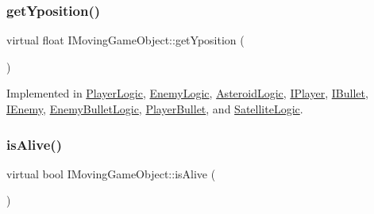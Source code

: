 \mbox{\label{class_i_moving_game_object_a153c0017219e17262a9cceddba3f61d6}} 
\subsubsection{\texorpdfstring{get\+Yposition()}{getYposition()}}
{\footnotesize\ttfamily virtual float I\+Moving\+Game\+Object\+::get\+Yposition (\begin{DoxyParamCaption}{ }\end{DoxyParamCaption})\hspace{0.3cm}{\ttfamily [pure virtual]}}



Implemented in \hyperlink{class_player_logic_a58d683bde5ee078f3b21897f2a5f4677}{Player\+Logic}, \hyperlink{class_enemy_logic_ae614032054926a4a25ed56f61111392b}{Enemy\+Logic}, \hyperlink{class_asteroid_logic_a83863c5262a29b2999d04ad443622bbc}{Asteroid\+Logic}, \hyperlink{class_i_player_af72407abf2418dd9c1df50f29d51f0ef}{I\+Player}, \hyperlink{class_i_bullet_a36594de9a0c0ddd7083bca10ef5d8332}{I\+Bullet}, \hyperlink{class_i_enemy_a8011be7f510f6630250f8b9529815773}{I\+Enemy}, \hyperlink{class_enemy_bullet_logic_a0cfb3013a7613f7f6de91a6db04d03b1}{Enemy\+Bullet\+Logic}, \hyperlink{class_player_bullet_a240cab35d5d909366986b8661ee65d3c}{Player\+Bullet}, and \hyperlink{class_satellite_logic_a1b0cb67d5bdb3cb120ec12b2be65755c}{Satellite\+Logic}.

\mbox{\label{class_i_moving_game_object_ab88f75c872699dd1376e5e83f6188e34}} 
\subsubsection{\texorpdfstring{is\+Alive()}{isAlive()}}
{\footnotesize\ttfamily virtual bool I\+Moving\+Game\+Object\+::is\+Alive (\begin{DoxyParamCaption}{ }\end{DoxyParamCaption})\hspace{0.3cm}{\ttfamily [pure virtual]}}



